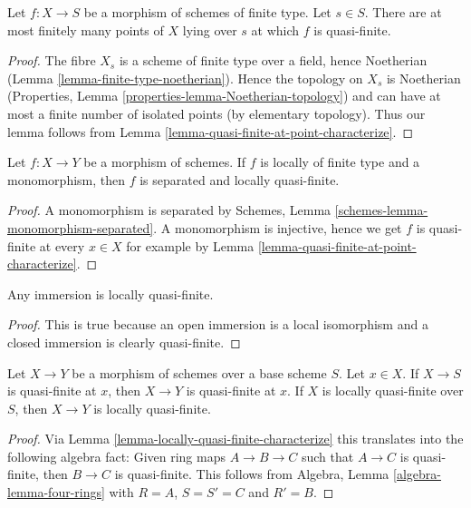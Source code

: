 \begin{lemma}
\label{lemma-quasi-finite-at-a-finite-number-of-points}
Let $f : X \to S$ be a morphism of schemes of finite type.
Let $s \in S$. There are at most finitely many points
of $X$ lying over $s$ at which $f$ is quasi-finite.
\end{lemma}

\begin{proof}
The fibre $X_s$ is a scheme of finite type over a field,
hence Noetherian (Lemma \ref{lemma-finite-type-noetherian}).
Hence the topology on $X_s$ is Noetherian (Properties, Lemma
\ref{properties-lemma-Noetherian-topology})
and can have at most a finite number of isolated points (by elementary
topology). Thus our lemma follows from
Lemma \ref{lemma-quasi-finite-at-point-characterize}.
\end{proof}

\begin{lemma}
\label{lemma-monomorphism-loc-finite-type-loc-quasi-finite}
Let $f : X \to Y$ be a morphism of schemes.
If $f$ is locally of finite type and a monomorphism, then $f$
is separated and locally quasi-finite.
\end{lemma}

\begin{proof}
A monomorphism is separated by Schemes, Lemma
\ref{schemes-lemma-monomorphism-separated}.
A monomorphism is injective, hence we get $f$
is quasi-finite at every $x \in X$ for example by
Lemma \ref{lemma-quasi-finite-at-point-characterize}.
\end{proof}

\begin{lemma}
\label{lemma-immersion-locally-quasi-finite}
Any immersion is locally quasi-finite.
\end{lemma}

\begin{proof}
This is true because an open immersion is a local isomorphism
and a closed immersion is clearly quasi-finite.
\end{proof}

\begin{lemma}
\label{lemma-permanence-quasi-finite}
Let $X \to Y$ be a morphism of schemes over a base scheme $S$.
Let $x \in X$. If $X \to S$ is quasi-finite at $x$, then
$X \to Y$ is quasi-finite at $x$.
If $X$ is locally quasi-finite over $S$, then $X \to Y$
is locally quasi-finite.
\end{lemma}

\begin{proof}
Via Lemma \ref{lemma-locally-quasi-finite-characterize} this translates
into the following algebra
fact: Given ring maps $A \to B \to C$ such that $A \to C$ is
quasi-finite, then $B \to C$ is quasi-finite.
This follows from
Algebra, Lemma \ref{algebra-lemma-four-rings}
with $R = A$, $S = S' = C$ and $R' = B$.
\end{proof}

